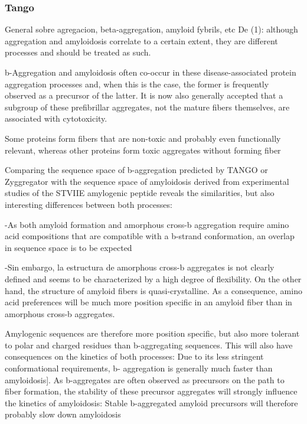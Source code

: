 \subsubsection{Tango}

General sobre agregacion, beta-aggregation, amyloid fybrils, etc
De (1): although aggregation and amyloidosis correlate to a certain extent, they are different
processes and should be treated as such.

b-Aggregation and amyloidosis often co-occur in these disease-associated protein aggregation processes and, when this is the case, the former is frequently observed as a precursor of the latter. It is now also generally accepted that a subgroup of these prefibrillar
aggregates, not the mature fibers themselves, are associated with cytotoxicity.

Some proteins form fibers that are non-toxic and probably even functionally relevant,
whereas other proteins form toxic aggregates without forming fiber

Comparing the sequence space of b-aggregation predicted by TANGO or Zyggregator with the sequence space of amyloidosis derived from experimental studies of the STVIIE amylogenic peptide reveals the similarities, but also interesting differences between both processes:

-As both amyloid formation and amorphous cross-b aggregation require amino acid compositions that are compatible with a b-strand conformation, an overlap in
sequence space is to be expected

-Sin embargo, la estructura de amorphous cross-b aggregates is not
clearly defined and seems to be characterized by a high degree of flexibility. On the other hand, the structure of amyloid fibers is quasi-crystalline. As a consequence, amino acid preferences will be much more position specific in an amyloid fiber than in amorphous cross-b aggregates.

Amylogenic sequences are therefore more position specific, but also more tolerant to polar and charged residues than b-aggregating sequences. This will also have consequences on the kinetics of both processes: Due to its less stringent conformational requirements, b-
aggregation is generally much faster than amyloidosis]. 
As b-aggregates are often observed as precursors on the path to fiber formation, the stability of these precursor aggregates will strongly influence the kinetics of amyloidosis: Stable b-aggregated amyloid precursors will therefore probably slow down amyloidosis

